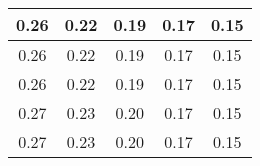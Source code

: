 \begin{large}\begin{tabular}{|c|c|c|c|c|}
\hline
0.26&0.22&0.19&0.17&0.15\\\hline
0.26&0.22&0.19&0.17&0.15\\\hline
0.26&0.22&0.19&0.17&0.15\\\hline
0.27&0.23&0.20&0.17&0.15\\\hline
0.27&0.23&0.20&0.17&0.15\\\hline
\end{tabular}
\end{large}